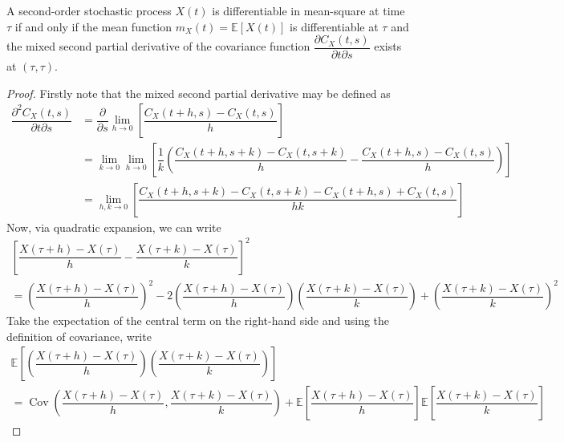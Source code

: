 \documentclass[11pt]{report} %
\begin{document}
\begin{theorem}
A second-order stochastic process $X\left(t\right)$ is differentiable in mean-square at time $\tau$ if and only if the mean function $m_{X}\left(t\right) = \mathbb{E}\left[X\left(t\right)\right]$ is differentiable at $\tau$ and the mixed second partial derivative of the covariance function $\dfrac{\partial C_{X}\left(t, s\right)}{\partial t \partial s}$ exists at $\left(\tau, \tau\right)$.
\end{theorem}
\begin{proof}
Firstly note that the mixed second partial derivative may be defined as
\begin{align}
\dfrac{\partial^{2}C_{X}\left(t,s\right)}{\partial t\partial s} &= \dfrac{\partial}{\partial s}\lim_{h\to0}\left[\dfrac{C_{X}\left(t+h,s\right)-C_{X}\left(t,s\right)}{h}\right] \\
& =\lim_{k\to0}\lim_{h\to0}\left[\dfrac{1}{k}\left(\dfrac{C_{X}\left(t+h,s+k\right)-C_{X}\left(t,s+k\right)}{h}-\dfrac{C_{X}\left(t+h,s\right)-C_{X}\left(t,s\right)}{h}\right)\right] \\
& =\lim_{h,k\to0}\left[\dfrac{C_{X}\left(t+h,s+k\right)-C_{X}\left(t,s+k\right)-C_{X}\left(t+h,s\right)+C_{X}\left(t,s\right)}{hk}\right]
\end{align}
Now, via quadratic expansion, we can write
\begin{multline}
\left[\dfrac{X\left(\tau+h\right)-X\left(\tau\right)}{h}-\dfrac{X\left(\tau+k\right)-X\left(\tau\right)}{k}\right]^{2} \\
=\left(\dfrac{X\left(\tau+h\right)-X\left(\tau\right)}{h}\right)^{2}-2\left(\dfrac{X\left(\tau+h\right)-X\left(\tau\right)}{h}\right)\left(\dfrac{X\left(\tau+k\right)-X\left(\tau\right)}{k}\right)+\left(\dfrac{X\left(\tau+k\right)-X\left(\tau\right)}{k}\right)^{2}
\end{multline}
Take the expectation of the central term on the right-hand side and using the definition of covariance, write
\begin{multline}
\mathbb{E}\left[\left(\dfrac{X\left(\tau+h\right)-X\left(\tau\right)}{h}\right)\left(\dfrac{X\left(\tau+k\right)-X\left(\tau\right)}{k}\right)\right] \\
=\operatorname{Cov}\left(\dfrac{X\left(\tau+h\right)-X\left(\tau\right)}{h},\dfrac{X\left(\tau+k\right)-X\left(\tau\right)}{k}\right)+\mathbb{E}\left[\dfrac{X\left(\tau+h\right)-X\left(\tau\right)}{h}\right]\mathbb{E}\left[\dfrac{X\left(\tau+k\right)-X\left(\tau\right)}{k}\right]
\end{multline}

\end{proof}
\end{document}
